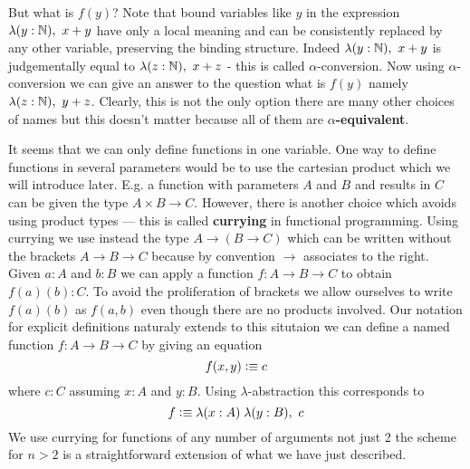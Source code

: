 But what is $f(y)$? Note that bound
variables like $y$ in the expression $\lam{y:\nat} x + y$
have only a local meaning and can be consistently replaced by any
other variable, preserving the binding structure. Indeed $\lam{y:\nat} x + y$ is judgementally equal to
$\lam{z:\nat} x + z$ - this is called $\alpha$-conversion. Now
using $\alpha$-conversion we can give an answer to the question 
what is $f(y)$ namely  $\lam{z:\nat} y + z$. Clearly, this is not
the only option there are many other choices of names but this doesn't
matter because all of them are \textbf{$\alpha$-equivalent}.

It seems that we can only define functions in one variable. One
way to define functions in several parameters would be to use the
cartesian product which we will introduce later. E.g. a function with
parameters $A$ and $B$ and results in $C$ can be given the type 
$A \times B \to C$. However, there is another choice which avoids
using product types --- this is called \textbf{currying} in functional
programming. Using currying we use instead the type $A \to (B \to C)$
which can be written without the brackets $A \to B \to C$ because
by convention $\to$ associates to the right. Given $a : A$ and $b : B$
we can apply a function $f : A \to B \to C$ to obtain $f(a)(b) :
C$. To avoid the proliferation of brackets we allow ourselves to
write $f(a)(b)$ as $f(a,b)$ even though there are no products
involved. Our notation for explicit definitions naturaly extends to
this situtaion we can define a named function $f : A \to B \to C$ by
giving an equation
\[ f(x,y) \vcentcolon\equiv c\]
where $c:C$ assuming $x:A$ and $y:B$. Using $\lambda$-abstraction this
corresponds to
\[ f \defeq \lam{x:A}{y:B} c \] We use currying for functions of any number of arguments not just 2 the scheme for $n>2$ is a straightforward extension of what we have just described.
 


